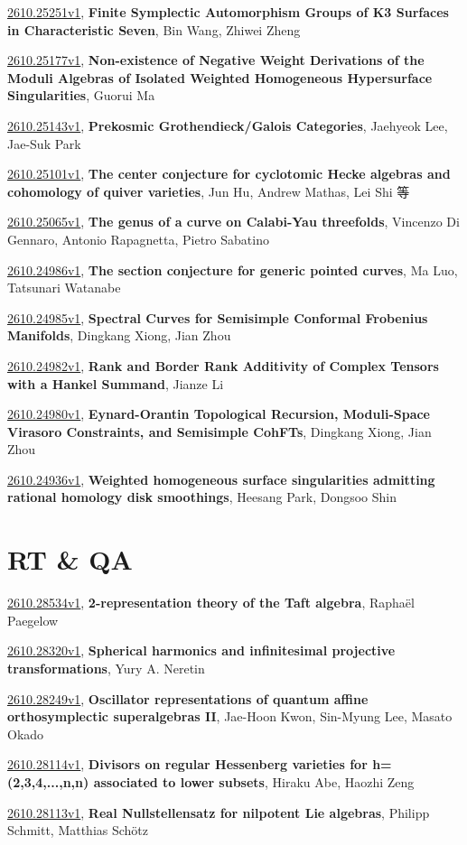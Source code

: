\documentclass[9pt, a4paper]{article}
\theoremstyle{plain}
\theoremstyle{definition}
\theoremstyle{remark}
\newcommand{\arxiv}[3]{\href{https://arxiv.org/abs/#1}{#1}, \textbf{\textcolor{arxivblue}{#2}}, #3}
\begin{document}
\arxiv{2610.25251v1}{Finite Symplectic Automorphism Groups of K3 Surfaces in Characteristic Seven}{Bin Wang, Zhiwei Zheng}

\arxiv{2610.25177v1}{Non-existence of Negative Weight Derivations of the Moduli Algebras of Isolated Weighted Homogeneous Hypersurface Singularities}{Guorui Ma}

\arxiv{2610.25143v1}{Prekosmic Grothendieck/Galois Categories}{Jaehyeok Lee, Jae-Suk Park}

\arxiv{2610.25101v1}{The center conjecture for cyclotomic Hecke algebras and cohomology of quiver varieties}{Jun Hu, Andrew Mathas, Lei Shi 等}

\arxiv{2610.25065v1}{The genus of a curve on Calabi-Yau threefolds}{Vincenzo Di Gennaro, Antonio Rapagnetta, Pietro Sabatino}

\arxiv{2610.24986v1}{The section conjecture for generic pointed curves}{Ma Luo, Tatsunari Watanabe}

\arxiv{2610.24985v1}{Spectral Curves for Semisimple Conformal Frobenius Manifolds}{Dingkang Xiong, Jian Zhou}

\arxiv{2610.24982v1}{Rank and Border Rank Additivity of Complex Tensors with a Hankel Summand}{Jianze Li}

\arxiv{2610.24980v1}{Eynard-Orantin Topological Recursion, Moduli-Space Virasoro Constraints, and Semisimple CohFTs}{Dingkang Xiong, Jian Zhou}

\arxiv{2610.24936v1}{Weighted homogeneous surface singularities admitting rational homology disk smoothings}{Heesang Park, Dongsoo Shin}


\section{RT \& QA}
\arxiv{2610.28534v1}{2-representation theory of the Taft algebra}{Raphaël Paegelow}

\arxiv{2610.28320v1}{Spherical harmonics and infinitesimal projective transformations}{Yury A. Neretin}

\arxiv{2610.28249v1}{Oscillator representations of quantum affine orthosymplectic superalgebras II}{Jae-Hoon Kwon, Sin-Myung Lee, Masato Okado}

\arxiv{2610.28114v1}{Divisors on regular Hessenberg varieties for h=(2,3,4,...,n,n) associated to lower subsets}{Hiraku Abe, Haozhi Zeng}

\arxiv{2610.28113v1}{Real Nullstellensatz for nilpotent Lie algebras}{Philipp Schmitt, Matthias Schötz}
\end{document}
